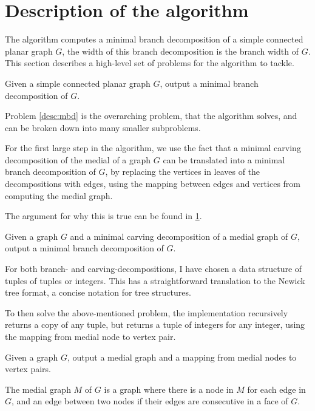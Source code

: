 \documentclass{article}
\begin{document}
\section{Description of the algorithm}

	The algorithm computes a minimal branch decomposition of a simple connected planar graph $G$, the width of this branch decomposition is the branch width of $G$. This section describes a high-level set of problems for the algorithm to tackle.

	\begin{problem}\label{desc:mbd}
		Given a simple connected planar graph $G$, output a minimal branch decomposition of $G$.
	\end{problem}

	Problem \ref{desc:mbd} is the overarching problem, that the algorithm solves, and can be broken down into many smaller subproblems.

	For the first large step in the algorithm, we use the fact that a minimal carving decomposition of the medial of a graph $G$ can be translated into a minimal branch decomposition of $G$, by replacing the vertices in leaves of the decompositions with edges, using the mapping between edges and vertices from computing the medial graph.

	The argument for why this is true can be found in \ref{}.

	\begin{problem}
		Given a graph $G$ and a minimal carving decomposition of a medial graph of $G$, output a minimal branch decomposition of $G$.
	\end{problem}

	For both branch- and carving-decompositions, I have chosen a data structure of tuples of tuples or integers. This has a straightforward translation to the Newick tree format, a concise notation for tree structures.

	To then solve the above-mentioned problem, the implementation recursively returns a copy of any tuple, but returns a tuple of integers for any integer, using the mapping from medial node to vertex pair.


	\begin{problem}
		Given a graph $G$, output a medial graph and a mapping from medial nodes to vertex pairs.
	\end{problem}

	The medial graph $M$ of $G$ is a graph where there is a node in $M$ for each edge in $G$, and an edge between two nodes if their edges are consecutive in a face of $G$.
\end{document}
